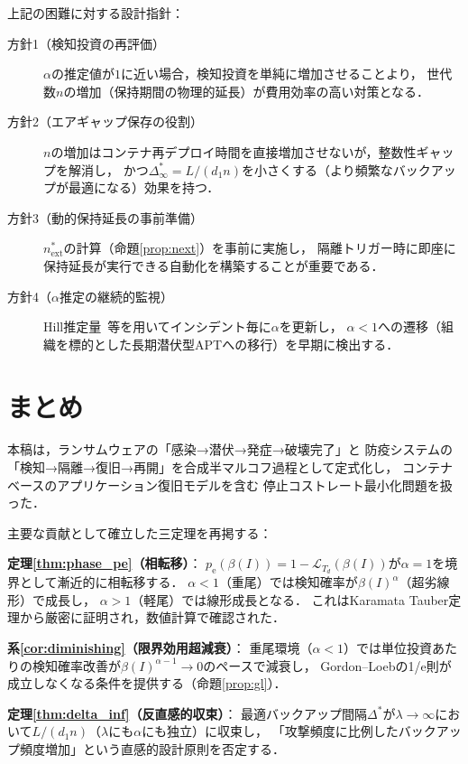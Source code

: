 \documentclass[12pt,a4paper]{article}
\theoremstyle{plain}
\theoremstyle{definition}
\theoremstyle{remark}
\newcommand{\calL}{\mathcal{L}}
\newcommand{\pe}{p_{\mathrm{e}}}
\newcommand{\betaI}{\beta(I)}
\newcommand{\Dopt}{\Delta^{*}}
\begin{document}
上記の困難に対する設計指針：

\begin{description}
\item[方針1（検知投資の再評価）]
  $\alpha$の推定値が$1$に近い場合，検知投資を単純に増加させることより，
  世代数$n$の増加（保持期間の物理的延長）が費用効率の高い対策となる．
  
\item[方針2（エアギャップ保存の役割）]
  $n$の増加はコンテナ再デプロイ時間を直接増加させないが，整数性ギャップを解消し，
  かつ$\Dopt_\infty=L/(d_1 n)$を小さくする（より頻繁なバックアップが最適になる）効果を持つ．

\item[方針3（動的保持延長の事前準備）]
  $n_{\mathrm{ext}}^*$の計算（命題\ref{prop:next}）を事前に実施し，
  隔離トリガー時に即座に保持延長が実行できる自動化を構築することが重要である．
  
\item[方針4（$\alpha$推定の継続的監視）]
  Hill推定量~\cite{hill1975}等を用いてインシデント毎に$\alpha$を更新し，
  $\alpha<1$への遷移（組織を標的とした長期潜伏型APTへの移行）を早期に検出する．
\end{description}

\section{まとめ}
\label{sec:conclusion}

本稿は，ランサムウェアの「感染→潜伏→発症→破壊完了」と
防疫システムの「検知→隔離→復旧→再開」を合成半マルコフ過程として定式化し，
コンテナベースのアプリケーション復旧モデルを含む
停止コストレート最小化問題を扱った．

主要な貢献として確立した三定理を再掲する：

\textbf{定理\ref{thm:phase_pe}（相転移）}：
$\pe(\betaI)=1-\calL_{T_d}(\betaI)$が$\alpha=1$を境界として漸近的に相転移する．
$\alpha<1$（重尾）では検知確率が$\betaI^\alpha$（超劣線形）で成長し，
$\alpha>1$（軽尾）では線形成長となる．
これはKaramata Tauber定理から厳密に証明され，数値計算で確認された．

\textbf{系\ref{cor:diminishing}（限界効用超減衰）}：
重尾環境（$\alpha<1$）では単位投資あたりの検知確率改善が$\betaI^{\alpha-1}\to0$のペースで減衰し，
Gordon--Loebの1/e則が成立しなくなる条件を提供する（命題\ref{prop:gl}）．

\textbf{定理\ref{thm:delta_inf}（反直感的収束）}：
最適バックアップ間隔$\Dopt$が$\lambda\to\infty$において$L/(d_1 n)$（$\lambda$にも$\alpha$にも独立）に収束し，
「攻撃頻度に比例したバックアップ頻度増加」という直感的設計原則を否定する．
\end{document}
